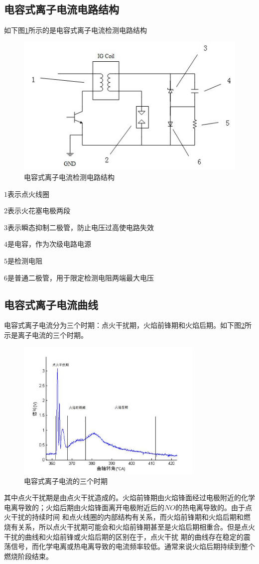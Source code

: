 \subsection{电容式离子电流电路结构}
如下图\ref{fig:ionstruct}所示的是电容式离子电流检测电路结构
\begin{figure}[!h]
	\centering
	\includegraphics{thesis_figure/ion_struct}
	\caption{电容式离子电流检测电路结构}
	\label{fig:ionstruct}
\end{figure}
\par$1$表示点火线圈
\par$2$表示火花塞电极两段
\par$3$表示瞬态抑制二极管，防止电压过高使电路失效
\par$4$是电容，作为次级电路电源
\par$5$是检测电阻
\par$6$是普通二极管，用于限定检测电阻两端最大电压
\subsection{电容式离子电流曲线}
电容式离子电流分为三个时期：点火干扰期，火焰前锋期和火焰后期。如下图\ref{fig:ion_basic}所示是离子电流的三个时期。
\begin{figure}[!h]
	\centering
	\includegraphics[width = 0.8\textwidth]{thesis_figure/model_chapter/ion_basic}
	\caption{电容式离子电流的三个时期}
	\label{fig:ion_basic}
\end{figure}
其中点火干扰期是由点火干扰造成的。火焰前锋期由火焰锋面经过电极附近的化学电离导致的；火焰后期由火焰锋面离开电极附近后的$NO$的热电离导致的。由于点火干扰的持续时间
和点火线圈的内部结构有关系，而火焰前锋期和火焰后期和燃烧有关系，所以点火干扰期可能会和火焰前锋期甚至是火焰后期相重合。但是点火干扰的曲线和火焰前锋或火焰后期的区别在于，点火干扰
期的曲线存在稳定的震荡信号，而化学电离或热电离导致的电流频率较低。通常来说火焰后期持续到整个燃烧阶段结束。
